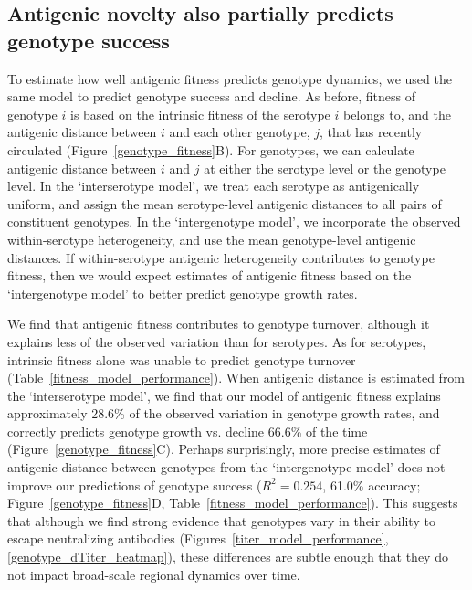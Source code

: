 \documentclass[11pt,oneside,letterpaper]{article}
\begin{document}
\subsection*{Antigenic novelty also partially predicts genotype success}
To estimate how well antigenic fitness predicts genotype dynamics, we used the same model to predict genotype success and decline.
As before, fitness of genotype $i$ is based on the intrinsic fitness of the serotype $i$ belongs to, and the antigenic distance between $i$ and each other genotype, $j$, that has recently circulated (Figure~\ref{genotype_fitness}B).
For genotypes, we can calculate antigenic distance between $i$ and $j$ at either the serotype level or the genotype level.
In the `interserotype model', we treat each serotype as antigenically uniform, and assign the mean serotype-level antigenic distances to all pairs of constituent genotypes.
In the `intergenotype model', we incorporate the observed within-serotype heterogeneity, and use the mean genotype-level antigenic distances.
If within-serotype antigenic heterogeneity contributes to genotype fitness, then we would expect estimates of antigenic fitness based on the `intergenotype model' to better predict genotype growth rates.

We find that antigenic fitness contributes to genotype turnover, although it explains less of the observed variation than for serotypes.
As for serotypes, intrinsic fitness alone was unable to predict genotype turnover (Table~\ref{fitness_model_performance}).
When antigenic distance is estimated from the `interserotype model', we find that our model of antigenic fitness explains approximately 28.6\% of the observed variation in genotype growth rates, and correctly predicts genotype growth vs. decline 66.6\% of the time (Figure~\ref{genotype_fitness}C).
Perhaps surprisingly, more precise estimates of antigenic distance between genotypes from the `intergenotype model' does not improve our predictions of genotype success ($R^2 = 0.254$, 61.0\% accuracy; Figure~\ref{genotype_fitness}D, Table~\ref{fitness_model_performance}).
This suggests that although we find strong evidence that genotypes vary in their ability to escape neutralizing antibodies (Figures~\ref{titer_model_performance}, \ref{genotype_dTiter_heatmap}), these differences are subtle enough that they do not impact broad-scale regional dynamics over time.
\end{document}
